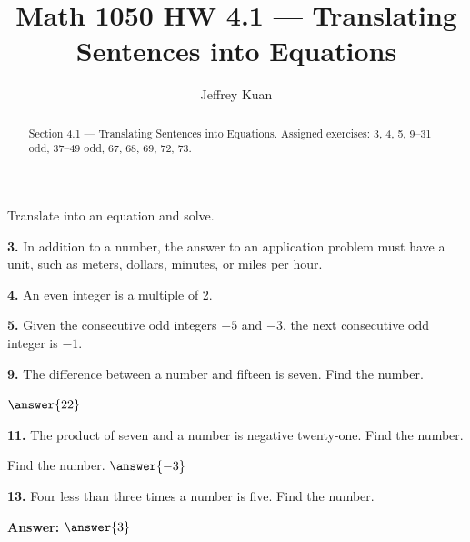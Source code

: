 \documentclass{ximera}
\author{Jeffrey Kuan}
\title{Math 1050 HW 4.1 --- Translating Sentences into Equations}
\begin{document}
\begin{abstract}
    Section 4.1 --- Translating Sentences into Equations.
    Assigned exercises: 3, 4, 5, 9–31 odd, 37–49 odd, 67, 68, 69, 72, 73.
\end{abstract}

\maketitle

Translate into an equation and solve.

\begin{problem}
\textbf{3.} In addition to a number, the answer to an application problem must have a unit,
  such as meters, dollars, minutes, or miles per hour.

\begin{multipleChoice}
\end{multipleChoice}
\end{problem}

\begin{problem}
\textbf{4.} An even integer is a multiple of 2.

\begin{multipleChoice}
\end{multipleChoice}
\end{problem}

\begin{problem}
\textbf{5.} Given the consecutive odd integers $-5$ and $-3$, the next consecutive odd integer
  is $-1$.

\begin{multipleChoice}
\end{multipleChoice}
\end{problem}

\begin{problem}
\textbf{9.} The difference between a number and fifteen is seven. Find the number.

 $\answer{22}$
\end{problem}

\begin{problem}
\textbf{11.} The product of seven and a number is negative twenty-one. Find the number.

Find the number. $\answer{-3}$
\end{problem}

\begin{problem}
\textbf{13.} Four less than three times a number is five. Find the number.

\textbf{Answer:} $\answer{3}$
\end{problem}
\end{document}
